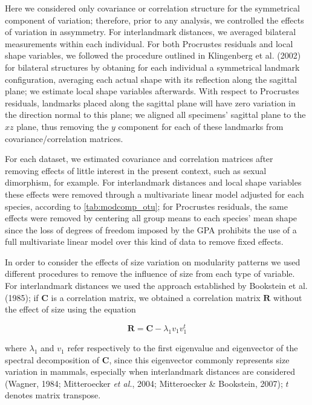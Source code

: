 \documentclass[12pt,twoside]{report}
\begin{document}
Here we considered only covariance or correlation structure for the
symmetrical component of variation; therefore, prior to any analysis, we
controlled the effects of variation in assymmetry. For interlandmark
distances, we averaged bilateral measurements within each individual.
For both Procrustes residuals and local shape variables, we followed the
procedure outlined in Klingenberg et al. (2002) for bilateral structures
by obtaning for each individual a symmetrical landmark configuration,
averaging each actual shape with its reflection along the sagittal
plane; we estimate local shape variables afterwards. With respect to
Procrustes residuals, landmarks placed along the sagittal plane will
have zero variation in the direction normal to this plane; we aligned
all specimens' sagittal plane to the $xz$ plane, thus removing the $y$
component for each of these landmarks from covariance/correlation
matrices.

For each dataset, we estimated covariance and correlation matrices after
removing effects of little interest in the present context, such as
sexual dimorphism, for example. For interlandmark distances and local
shape variables these effects were removed through a multivariate linear
model adjusted for each species, according to \autoref{tab:modcomp_otu};
for Procrustes residuals, the same effects were removed by centering all
group means to each species' mean shape since the loss of degrees of
freedom imposed by the GPA prohibits the use of a full multivariate
linear model over this kind of data to remove fixed effects.

In order to consider the effects of size variation on modularity
patterns we used different procedures to remove the influence of size
from each type of variable. For interlandmark distances we used the
approach established by Bookstein et al. (1985); if $\mathbf{C}$ is a
correlation matrix, we obtained a correlation matrix $\mathbf{R}$
without the effect of size using the equation

\begin{equation}
\mathbf{R} = \mathbf{C} - \lambda_1 v_1 v^{t}_1
\label{eq:iso}
\end{equation}

where $\lambda_1$ and $v_1$ refer respectively to the first eigenvalue
and eigenvector of the spectral decomposition of $\mathbf{C}$, since
this eigenvector commonly represents size variation in mammals,
especially when interlandmark distances are considered (Wagner, 1984;
Mitteroecker \emph{et al.}, 2004; Mitteroecker \& Bookstein, 2007); $t$
denotes matrix transpose.
\end{document}
